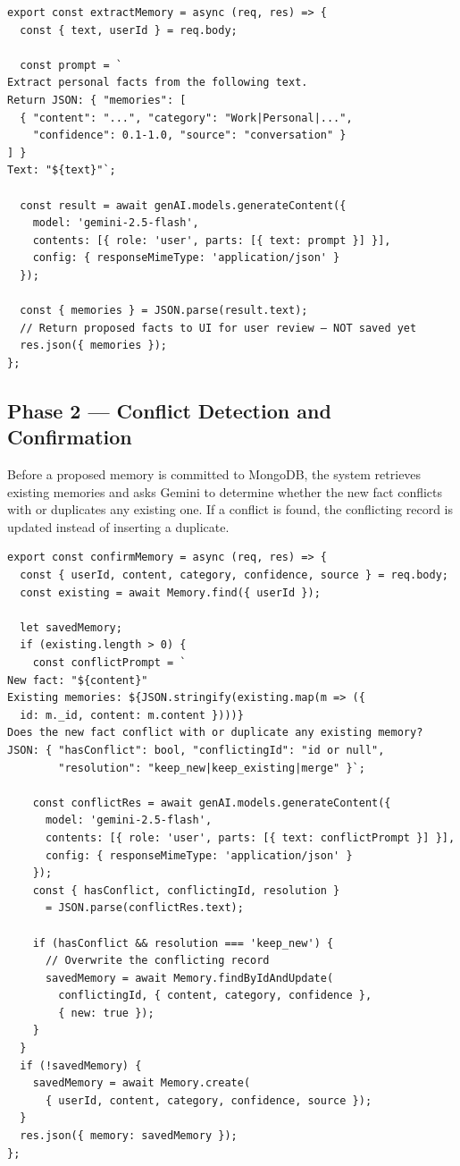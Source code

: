 \documentclass[12pt,a4paper]{report}
\begin{document}
\begin{lstlisting}[caption={memoryController.js — Phase 1: Memory Extraction}]
export const extractMemory = async (req, res) => {
  const { text, userId } = req.body;

  const prompt = `
Extract personal facts from the following text.
Return JSON: { "memories": [
  { "content": "...", "category": "Work|Personal|...",
    "confidence": 0.1-1.0, "source": "conversation" }
] }
Text: "${text}"`;

  const result = await genAI.models.generateContent({
    model: 'gemini-2.5-flash',
    contents: [{ role: 'user', parts: [{ text: prompt }] }],
    config: { responseMimeType: 'application/json' }
  });

  const { memories } = JSON.parse(result.text);
  // Return proposed facts to UI for user review — NOT saved yet
  res.json({ memories });
};
\end{lstlisting}

\subsection{Phase 2 — Conflict Detection and Confirmation}

Before a proposed memory is committed to MongoDB, the system retrieves existing memories and asks Gemini to determine whether the new fact conflicts with or duplicates any existing one. If a conflict is found, the conflicting record is updated instead of inserting a duplicate.

\begin{lstlisting}[caption={memoryController.js — Phase 2: Conflict Detection and Save}]
export const confirmMemory = async (req, res) => {
  const { userId, content, category, confidence, source } = req.body;
  const existing = await Memory.find({ userId });

  let savedMemory;
  if (existing.length > 0) {
    const conflictPrompt = `
New fact: "${content}"
Existing memories: ${JSON.stringify(existing.map(m => ({
  id: m._id, content: m.content })))}
Does the new fact conflict with or duplicate any existing memory?
JSON: { "hasConflict": bool, "conflictingId": "id or null",
        "resolution": "keep_new|keep_existing|merge" }`;

    const conflictRes = await genAI.models.generateContent({
      model: 'gemini-2.5-flash',
      contents: [{ role: 'user', parts: [{ text: conflictPrompt }] }],
      config: { responseMimeType: 'application/json' }
    });
    const { hasConflict, conflictingId, resolution }
      = JSON.parse(conflictRes.text);

    if (hasConflict && resolution === 'keep_new') {
      // Overwrite the conflicting record
      savedMemory = await Memory.findByIdAndUpdate(
        conflictingId, { content, category, confidence },
        { new: true });
    }
  }
  if (!savedMemory) {
    savedMemory = await Memory.create(
      { userId, content, category, confidence, source });
  }
  res.json({ memory: savedMemory });
};
\end{lstlisting}
\end{document}
